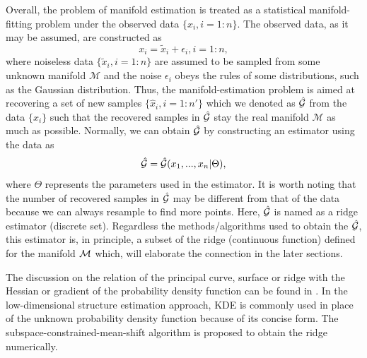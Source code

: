 \documentclass[aos,preprint]{imsart}
\theoremstyle{remark}
\begin{document}
Overall, the problem of manifold estimation is treated as a statistical manifold-fitting problem under the observed data $\{x_i, i=1:n\}$. The observed data, as it may be assumed, are constructed as 
\[
x_i=\tilde{x}_i+\epsilon_i, i=1:n,
\] 
where noiseless data $\{\tilde{x}_i, i= 1:n\}$ are assumed to be sampled from some unknown manifold $\mathcal M$ and the noise $\epsilon_i$ obeys the rules of some distributions, such as the Gaussian distribution.  %
Thus, the manifold-estimation problem is aimed at recovering a set of new samples $\{\hat{x}_i, i= 1:n'\}$ which we denoted as $\hat{\cal G}$ from the data $\{x_i\}$ such that the recovered samples in $\hat{\cal G}$ stay the real manifold $\mathcal M$ as much as possible. Normally, we can obtain $\hat{\cal G}$ by constructing an estimator using the data as
\begin{equation}\label{Estimator}
\hat{\cal G} = \hat{\cal G}(x_1,...,x_n | \Theta),
\end{equation}
where $\Theta$ represents the parameters used in the estimator. It is worth noting that the number of recovered samples in $\hat{\cal G}$ may be different from that of the data because we can always resample to find more points. Here, $\hat{\cal G}$ is named as a ridge estimator (discrete set). Regardless the methods/algorithms used to obtain the $\hat{\cal G}$, this estimator is, in principle, a subset of the ridge (continuous function) defined for the manifold $\cal{M}$ which, will elaborate the connection in the later sections.

The discussion on the relation of the principal curve, surface or ridge with the Hessian or gradient of the probability density function can be found in \cite{ozertem2011locally,genovese2014nonparametric,mohammed2017manifold}. In the low-dimensional structure estimation approach, KDE is commonly used in place of the unknown probability density function because of its concise form. The subspace-constrained-mean-shift algorithm is proposed to obtain the ridge numerically.
\end{document}
